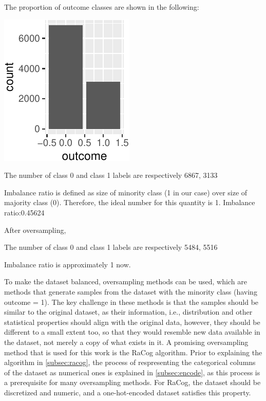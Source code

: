 \documentclass{article}
\begin{document}
The proportion of outcome classes are shown in the following:

\begin{center}\includegraphics{report_files/figure-latex/unnamed-chunk-6-1} \end{center}

The number of class 0 and class 1 labels are respectively 6867, 3133

Imbalance ratio is defined as size of minority class (1 in our case)
over size of majority class (0). Therefore, the ideal number for this
quantity is 1. Imbalance ratio:0.45624

After oversampling,

The number of class 0 and class 1 labels are respectively 5484, 5516

Imbalance ratio is approximately 1 now.

To make the dataset balanced, oversampling methods can be used, which
are methods that generate samples from the dataset with the minority
class (having outcome = 1). The key challenge in these methods is that
the samples should be similar to the original dataset, as their
information, i.e., distribution and other statistical properties should
align with the original data, however, they should be different to a
small extent too, so that they would resemble new data available in the
dataset, not merely a copy of what exists in it. A promising
oversampling method that is used for this work is the RaCog algorithm.
Prior to explaining the algorithm in \ref{subsec:racog}, the process of
respresenting the categorical columns of the dataset as numerical ones
is explained in \ref{subsec:encode}, as this process is a prerequisite
for many oversampling methods. For RaCog, the dataset should be
discretized and numeric, and a one-hot-encoded dataset satisfies this
property.
\end{document}
